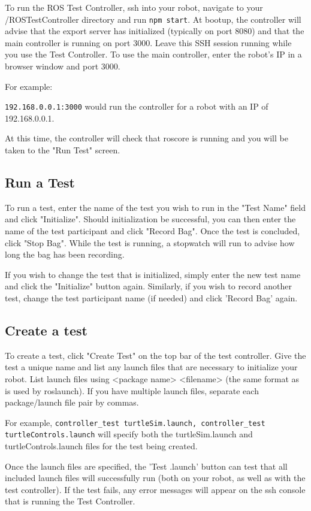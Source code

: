 \documentclass[onecolumn, draftclsnofoot,10pt, compsoc]{report}
\begin{document}
To run the ROS Test Controller, ssh into your robot, navigate to your /ROSTestController directory and run \texttt{npm start}. At bootup, the controller will advise that the export server has initialized (typically on port 8080) and that the main controller is running on port 3000. Leave this SSH session running while you use the Test Controller. To use the main controller, enter the robot's IP in a browser window and port 3000.

For example:

\texttt{192.168.0.0.1:3000} would run the controller for a robot with an IP of 192.168.0.0.1.

At this time, the controller will check that roscore is running and you will be taken to the "Run Test" screen.
\subsection{Run a Test}

To run a test, enter the name of the test you wish to run in the "Test Name" field and click "Initialize". Should initialization be successful, you can then enter the name of the test participant and click "Record Bag". Once the test is concluded, click "Stop Bag". While the test is running, a stopwatch will run to advise how long the bag has been recording.

If you wish to change the test that is initialized, simply enter the new test name and click the "Initialize" button again. Similarly, if you wish to record another test, change the test participant name (if needed) and click 'Record Bag' again.

\subsection{Create a test}
To create a test, click "Create Test" on the top bar of the test controller. Give the test a unique name and list any launch files that are necessary to initialize your robot. List launch files using <package name> <filename> (the same format as is used by roslaunch). If you have multiple launch files, separate each package/launch file pair by commas. 

For example, \texttt{controller\_test turtleSim.launch, controller\_test turtleControls.launch} will specify both the turtleSim.launch and turtleControls.launch files for the test being created.

Once the launch files are specified, the 'Test .launch' button can test that all included launch files will successfully run (both on your robot, as well as with the test controller). If the test fails, any error messages will appear on the ssh console that is running the Test Controller. 
\end{document}
